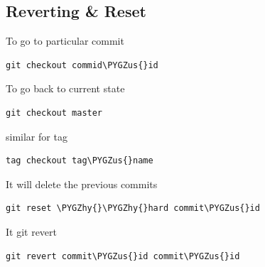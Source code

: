 \documentclass[letterpaper,10pt,english]{sphinxmanual}
\def\PYGZus{\char`\_}
\def\PYGZhy{\char`\-}
\begin{document}
\subsection{Reverting \& Reset}
\label{_source/things/git_commands:reverting-reset}
To go to particular commit

\begin{Verbatim}[commandchars=\\\{\}]
git checkout commid\PYGZus{}id
\end{Verbatim}

To go back to current state

\begin{Verbatim}[commandchars=\\\{\}]
git checkout master
\end{Verbatim}

similar for tag

\begin{Verbatim}[commandchars=\\\{\}]
tag checkout tag\PYGZus{}name
\end{Verbatim}

It will delete the previous commits

\begin{Verbatim}[commandchars=\\\{\}]
git reset \PYGZhy{}\PYGZhy{}hard commit\PYGZus{}id
\end{Verbatim}

It git revert

\begin{Verbatim}[commandchars=\\\{\}]
git revert commit\PYGZus{}id commit\PYGZus{}id
\end{Verbatim}
\end{document}
